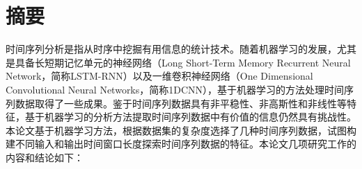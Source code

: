 \setlength{\headheight}{26pt}
\maketitle %
\MAKETITLE %
\makedeclaration %

\intobmk\chapter*{\texorpdfstring{摘\quad 要}{摘要}}
\setcounter{page}{1}
时间序列分析是指从时序中挖掘有用信息的统计技术。随着机器学习的发展，尤其是具备长短期记忆单元的神经网络（Long Short-Term Memory Recurrent Neural Network，简称LSTM-RNN）以及一维卷积神经网络（One Dimensional Convolutional Neural Networks，简称1DCNN），基于机器学习的方法处理时间序列数据取得了一些成果。鉴于时间序列数据具有非平稳性、非高斯性和非线性等特征，基于机器学习的分析方法提取时间序列数据中有价值的信息仍然具有挑战性。本论文基于机器学习方法，根据数据集的复杂度选择了几种时间序列数据，试图构建不同输入和输出时间窗口长度探索时间序列数据的特征。本论文几项研究工作的内容和结论如下：
